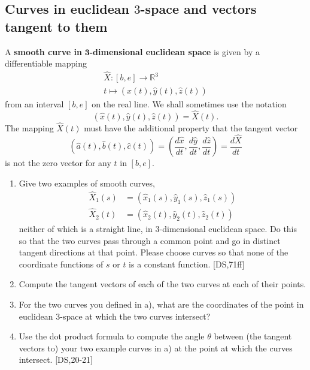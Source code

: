 \documentclass{ximera}
\begin{document}
\subsection*{Curves in euclidean $3$-space and vectors tangent to them}

\begin{definition}
A \textbf{smooth curve in }$\mathbf{3}$\textbf{-dimensional euclidean space}
is given by a differentiable mapping%
\begin{gather*}
\hat{X}:\left[  b,e\right]  \rightarrow\mathbb{R}^{3}\\
t\mapsto\left(  \hat{x}\left(  t\right)  ,\hat{y}\left(  t\right)  ,\hat
{z}\left(  t\right)  \right)
\end{gather*}
from an interval $\left[ b,e\right] $ on the real line. We shall
sometimes use the notation%
\[
\left(  \hat{x}\left(  t\right)  ,\hat{y}\left(  t\right)  ,\hat{z}\left(
t\right)  \right)  =\hat{X}\left(  t\right)  .
\]
The mapping $\hat{X}\left(  t\right)  $ must have the additional property that
the tangent vector
\[
\left(  \hat{a}\left(  t\right)  ,\hat{b}\left(  t\right)  ,\hat{c}\left(
t\right)  \right)  =\left(  \frac{d\hat{x}}{dt},\frac{d\hat{y}}{dt}%
,\frac{d\hat{z}}{dt}\right)  =\frac{d\hat{X}}{dt}%
\]
is not the zero vector for any $t$ in $\left[ b,e\right] $.
\end{definition}

\begin{problem}\hfil
\begin{enumerate}
\label{1}\item Give two examples of smooth curves,
\begin{align*}
\hat{X}_{1}\left(  s\right)   &  =\left(  \hat{x}_{1}\left(  s\right)
,\hat{y}_{1}\left(  s\right)  ,\hat{z}_{1}\left(  s\right)  \right) \\
\hat{X}_{2}\left(  t\right)   &  =\left(  \hat{x}_{2}\left(  t\right)
,\hat{y}_{2}\left(  t\right)  ,\hat{z}_{2}\left(  t\right)  \right)
\end{align*}
neither of which is a straight line, in $3$-dimensional euclidean space. Do
this so that the two curves pass through a common point and go in distinct
tangent directions at that point. Please choose curves so that none of the
coordinate functions of $s$ or $t$ is a constant function. [DS,71ff]

\item Compute the tangent vectors of each of the two curves at each of their points.

\item For the two curves you defined in a), what are the coordinates of the point
in euclidean $3$-space at which the two curves intersect?

\item Use the dot product formula to compute the angle $\theta$ between (the
tangent vectors to) your two example curves in a) at the point at which the
curves intersect. [DS,20-21]
\end{enumerate}
\end{problem}
\end{document}
